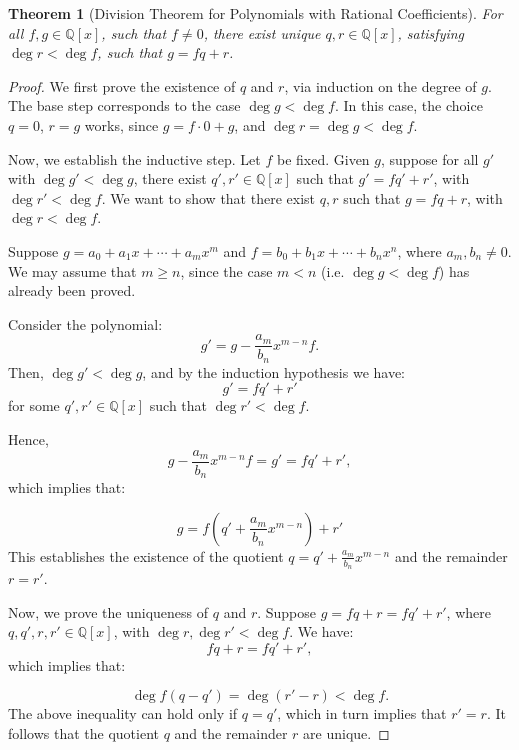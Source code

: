 \documentclass[a4paper,12pt]{report}
\newcounter{statement}
\numberwithin{statement}{chapter}
\newtheorem{thm}[statement]{Theorem}
\numberwithin{equation}{chapter}
\numberwithin{section}{chapter}
\numberwithin{subsection}{section}
\begin{document}
\begin{thm}[Division Theorem for Polynomials with Rational Coefficients]


For all $f, g \in \mathbb{Q}[x]$, such that $f \neq 0$, there exist unique $q, r \in \mathbb{Q}[x]$,
satisfying $\deg r < \deg f$, such that $g = fq + r$.
\end{thm}
\begin{proof}

We first prove the existence of $q$ and $r$, via induction on the degree of $g$.
The base step corresponds to the case $\deg g < \deg f$. In this case,
the choice $q = 0$, $r = g$ works, since $g = f\cdot 0 + g$,
and $\deg r = \deg g < \deg f$.




Now, we establish the inductive step.
Let $f$ be fixed.
Given $g$, suppose for all $g'$ with $\deg g' < \deg g$,
there exist $q', r' \in \mathbb{Q}[x]$ such that $g' = fq' + r'$,
with $\deg r' < \deg f$.
We want to show that there exist $q, r$ such that $g = fq + r$, with $\deg r < \deg f$.




Suppose $g = a_0 + a_1 x + \cdots + a_m x^m$ and $f = b_0 + b_1 x + \cdots + b_n x^n$,
where $a_m, b_n \neq 0$.
We may assume that $m \geq n$, since the case $m < n$ (i.e. $\deg g < \deg f$)
has already been proved.




Consider the polynomial:
\[
g' = g - \frac{a_m}{b_n}x^{m - n}f.
\]
Then, $\deg g' < \deg g$,
and by the induction hypothesis we have:
\[
g' = fq' + r'
\]
for some $q', r' \in \mathbb{Q}[x]$ such that $\deg r' < \deg f$.




Hence,
\[
g - \frac{a_m}{b_n}x^{m - n}f = g' = fq' + r',
\]
which implies that:




\[
g = f\left(q' + \frac{a_m}{b_n}x^{m - n}\right) + r'
\]
This establishes the existence of the quotient $q = q' + \frac{a_m}{b_n}x^{m - n}$ and the remainder $r = r'$.




Now, we prove the uniqueness of $q$ and $r$.
Suppose $g = fq + r = fq' + r'$, where $q, q', r, r' \in \mathbb{Q}[x]$,
with $\deg r, \deg r' < \deg f$. We have:
\[
fq + r = fq' + r',
\]
which implies that:




\[
\deg f(q - q') = \deg (r' - r) < \deg f.
\]
The above inequality can hold only if $q = q'$, which in turn implies that $r' = r$.
It follows that the quotient $q$ and the remainder $r$ are unique.


\end{proof}
\end{document}
